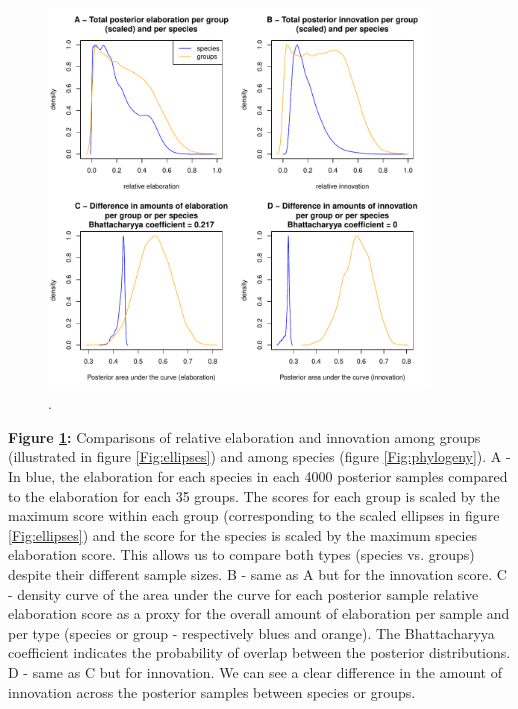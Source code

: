 \documentclass[12pt,letterpaper]{article}
\begin{document}
\begin{figure}[!htbp]
\centering
   \includegraphics[width=0.9\textwidth]{Figures/relative_EI.pdf}
\caption{.}
\label{Fig:relative_EI}
\end{figure}

\bigskip

\noindent \textbf{Figure \ref{Fig:relative_EI}:} Comparisons of relative elaboration and innovation among groups (illustrated in figure  \ref{Fig:ellipses}) and among species (figure \ref{Fig:phylogeny}).
A - In blue, the elaboration for each species in each 4000 posterior samples compared to the elaboration for each 35 groups.
The scores for each group is scaled by the maximum score within each group (corresponding to the scaled ellipses in figure  \ref{Fig:ellipses}) and the score for the species is scaled by the maximum species elaboration score.
This allows us to compare both types (species vs.
groups) despite their different sample sizes.
B - same as A but for the innovation score.
C - density curve of the area under the curve for each posterior sample relative elaboration score as a proxy for the overall amount of elaboration per sample and per type (species or group - respectively blues and orange).
The Bhattacharyya coefficient indicates the probability of overlap between the posterior distributions.
D - same as C but for innovation.
We can see a clear difference in the amount of innovation across the posterior samples between species or groups.
\end{document}
